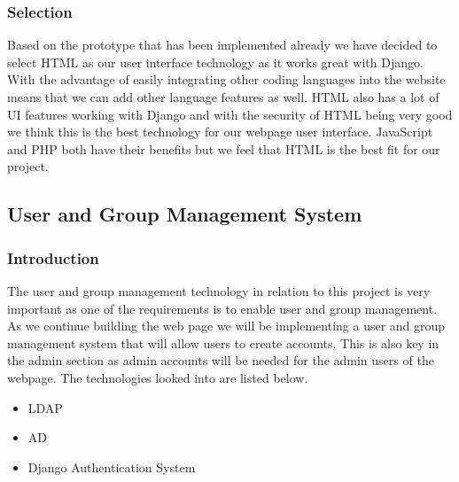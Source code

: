 \documentclass[draftclsnofoot,10pt,onecolumn]{IEEEtran} %
\begin{document}
\subsubsection{Selection}
Based on the prototype that has been implemented already we have decided to select HTML as our user interface technology
as it works great with Django. With the advantage of easily integrating other coding languages into the website means that
we can add other language features as well. HTML also has a lot of UI features working with Django and with the security of
HTML being very good we think this is the best technology for our webpage user interface. JavaScript and PHP both have
their benefits but we feel that HTML is the best fit for our project. \\

\subsection{User and Group Management System}

\subsubsection{Introduction}
The user and group management technology in relation to this project is very important as one of the requirements is to
enable user and group management. As we continue building the web page we will be implementing a user and group
management system that will allow users to create accounts. This is also key in the admin section as admin accounts will be
needed for the admin users of the webpage. The technologies looked into are listed below.

	\begin{itemize}
		\item LDAP
		\item AD
		\item Django Authentication System \\
	\end{itemize}
	
\end{document}
